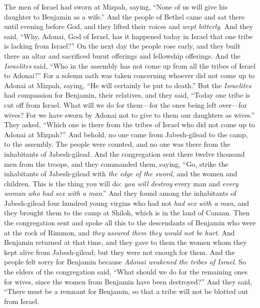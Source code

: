 \begin{biblechapter} %
 The men of Israel had sworn at Mizpah, saying, “None of us will give his daughter to Benjamin as a wife.”
\verse And the people of Bethel came and sat there until evening before God, and they lifted their voices and \textit{wept bitterly}.
\verse And they said, “Why, Adonai, God of Israel, has it happened today in Israel that one tribe is lacking from Israel?”
\verse On the next day the people rose early, and they built there an altar and sacrificed burnt offerings and fellowship offerings.
\verse And the \textit{Israelites} said, “Who in the assembly has not come up from all the tribes of Israel to Adonai?” For a solemn oath was taken concerning whoever did not come up to Adonai at Mizpah, saying, “He will certainly be put to death.”
\verse But the \textit{Israelites} had compassion for Benjamin, their relatives, and they said, “Today one tribe is cut off from Israel.
\verse What will we do for them—for the ones being left over—for wives? For we have sworn by Adonai not to give to them our daughters as wives.”
\verse They asked, “Which one is there from the tribes of Israel who did not come up to Adonai at Mizpah?” And behold, no one came from Jabesh-gilead to the camp, to the assembly.
\verse The people were counted, and no one was there from the inhabitants of Jabesh-gilead.
\verse And the congregation sent there twelve thousand men from the troops, and they commanded them, saying, “Go, strike the inhabitants of Jabesh-gilead with \textit{the edge of the sword}, and the women and children.
\verse This is the thing you will do: \textit{you will destroy} every man and \textit{every woman who had sex with a man}.”
\verse And they found among the inhabitants of Jabesh-gilead four hundred young virgins who had not \textit{had sex with a man}, and they brought them to the camp at Shiloh, which is in the land of Canaan.
\verse Then the congregation sent and spoke all this to the descendants of Benjamin who were at the rock of Rimmon, and \textit{they assured them they would not be hurt}.
\verse And Benjamin returned at that time, and they gave to them the women whom they kept alive from Jabesh-gilead; but they were not enough for them.
\verse And the people felt sorry for Benjamin because \textit{Adonai weakened the tribes of Israel}.
\verse So the elders of the congregation said, “What should we do for the remaining ones for wives, since the women from Benjamin have been destroyed?”
\verse And they said, “There must be a remnant for Benjamin, so that a tribe will not be blotted out from Israel.

\end{biblechapter}
